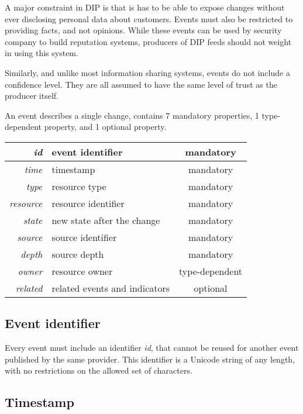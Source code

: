 \documentclass[conference]{IEEEtran}
\begin{document}
A major constraint in DIP is that is has to be able to expose changes without ever disclosing personal data about customers. Events must also be restricted to providing facts, and not opinions. While these events can be used by security company to build reputation systems, producers of DIP feeds should not weight in using this system.

Similarly, and unlike most information sharing systems, events do not include a confidence level. They are all assumed to have the same level of trust as the producer itself.

An event describes a single change, contains 7 mandatory properties, 1 type-dependent property, and 1 optional property.

\vspace{1em}
\begin{tabular}{ r | l | c }
\hline
\emph{id} & event identifier & mandatory \\ \hline
\emph{time} & timestamp & mandatory \\ \hline
\emph{type} & resource type & mandatory	\\ \hline
\emph{resource} & resource identifier & mandatory \\ \hline
\emph{state} & new state after the change & mandatory \\ \hline
\emph{source} & source identifier & mandatory \\ \hline
\emph{depth} & source depth & mandatory \\ \hline
\emph{owner} & resource owner & type-dependent \\ \hline
\emph{related} & related events and indicators & optional \\ \hline
\end{tabular}
\vspace{1em}

\subsection{Event identifier}

Every event must include an identifier \emph{id}, that cannot be reused for another event published by the same provider. This identifier is a Unicode string of any length, with no restrictions on the allowed set of characters. 

\subsection{Timestamp}
\end{document}
